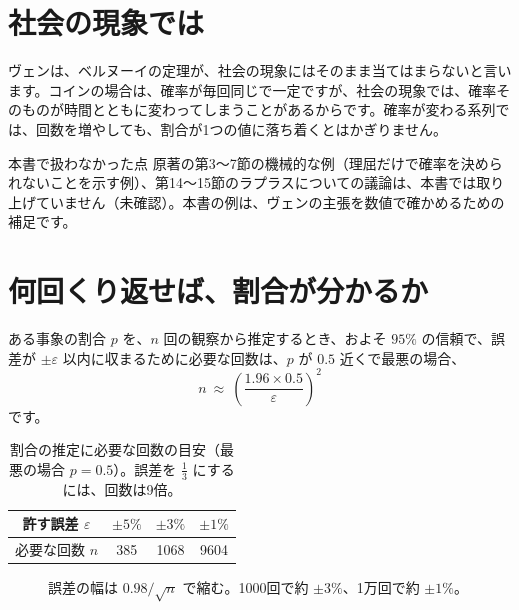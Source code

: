 \documentclass[a4paper,11pt,openany]{ltjsbook}
\begin{document}
\section{社会の現象では}

ヴェンは、ベルヌーイの定理が、社会の現象にはそのまま当てはまらないと言います。コインの場合は、確率が毎回同じで一定ですが、社会の現象では、確率そのものが時間とともに変わってしまうことがあるからです。確率が変わる系列では、回数を増やしても、割合が1つの値に落ち着くとはかぎりません。

\begin{notebox}{本書で扱わなかった点}
原著の第3〜7節の機械的な例（理屈だけで確率を決められないことを示す例）、第14〜15節のラプラスについての議論は、本書では取り上げていません（未確認）。本書の例は、ヴェンの主張を数値で確かめるための補足です。
\end{notebox}

\section{何回くり返せば、割合が分かるか}

ある事象の割合 $p$ を、$n$ 回の観察から推定するとき、およそ $95\%$ の信頼で、誤差が $\pm\varepsilon$ 以内に収まるために必要な回数は、$p$ が $0.5$ 近くで最悪の場合、
\[
n\ \approx\ \left(\frac{1.96\times0.5}{\varepsilon}\right)^2
\]
です。

\begin{table}[htbp]
\centering
\begin{tabular}{c|ccc}
\toprule
許す誤差 $\varepsilon$ & $\pm5\%$ & $\pm3\%$ & $\pm1\%$\\
\midrule
必要な回数 $n$ & 385 & 1068 & 9604\\
\bottomrule
\end{tabular}
\caption{割合の推定に必要な回数の目安（最悪の場合 $p=0.5$）。誤差を $\tfrac13$ にするには、回数は9倍。}
\end{table}

\begin{figure}[htbp]
\centering
{}
\caption{誤差の幅は $0.98/\sqrt n$ で縮む。1000回で約 $\pm3\%$、1万回で約 $\pm1\%$。}
\end{figure}
\end{document}
